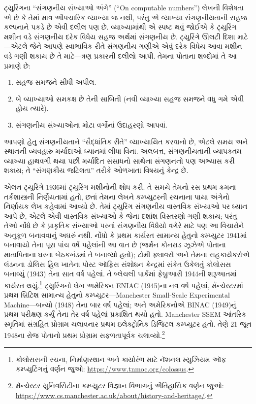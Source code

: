 \documentclass[../../../include/open-logic-section]{subfiles}
\begin{document}
\begin{digress}
ટ્યુરિંગના ``સંગણનીય સંખ્યાઓ અંગે'' (``On computable numbers'') લેખની
વિશેષતા એ છે કે તેમાં
માત્ર ઔપચારિક વ્યાખ્યા જ નથી, પરંતુ એ વ્યાખ્યા સંગણનીયતાની
સહજ કલ્પનાને પકડે છે એવી દલીલ પણ છે. વ્યાખ્યામાંથી એ સ્પષ્ટ
થવું જોઈએ કે ટ્યુરિંગ મશીન વડે સંગણનીય દરેક વિધેય સહજ અર્થમાં
સંગણનીય છે. ટ્યુરિંગે ઊલટી દિશા માટે---એટલે જેને આપણે
સ્વાભાવિક રીતે સંગણનીય ગણીએ એવું દરેક વિધેય આવા મશીન વડે
ગણી શકાય છે તે માટે---ત્રણ પ્રકારની દલીલો આપી. તેમના પોતાના
શબ્દોમાં તે આ પ્રમાણે છે:
\begin{enumerate}
\item સહજ સમજને સીધી અપીલ.
\item બે વ્યાખ્યાઓ સમકક્ષ છે તેની સાબિતી (નવી વ્યાખ્યા સહજ
  સમજને વધુ ગમે એવી હોય ત્યારે).
\item સંગણનીય સંખ્યાઓના મોટા વર્ગોનાં ઉદાહરણો આપવાં.
\end{enumerate}
આપણો હેતુ સંગણનીયતાને ``સૈદ્ધાંતિક રીતે'' વ્યાખ્યાયિત કરવાનો
છે, એટલે સમય અને સ્થાનની વ્યવહારુ મર્યાદાઓ ધ્યાનમાં લીધા
વિના. અલબત્ત, સંગણનીયતાની વ્યાપકતમ વ્યાખ્યા હાથવગી થયા
પછી મર્યાદિત સંસાધનો સાથેના સંગણનનો પણ અભ્યાસ કરી શકાય;
તે ``સંગણકીય જટિલતા'' તરીકે ઓળખાતા વિષયનું કેન્દ્ર છે.
\end{digress}

\begin{history}
એલન ટ્યુરિંગે 1936માં ટ્યુરિંગ મશીનોની શોધ કરી. તે સમયે તેમનો
રસ પ્રથમ ક્રમના તર્કશાસ્ત્રની નિર્ણેયતામાં હતો, છતાં તેમના
લેખને કમ્પ્યુટરની રચનાના પાયા અંગેનો નિર્ણાયક લેખ કહેવામાં
આવ્યો છે. તેમાં ટ્યુરિંગ સંગણનીય વાસ્તવિક સંખ્યાઓ પર ધ્યાન
આપે છે, એટલે એવી વાસ્તવિક સંખ્યાઓ કે જેના દશાંશ વિસ્તરણો
ગણી શકાય; પરંતુ તેઓ નોંધે છે કે પ્રાકૃતિક સંખ્યાઓ પરનાં
સંગણનીય વિધેયો વગેરે માટે પણ આ વિચારોને અનુકૂળ બનાવવાનું
અઘરું નથી. નોંધો કે પ્રથમ કાર્યરત સામાન્ય હેતુનો કમ્પ્યુટર
1941માં બનાવાયો તેના પૂરા પાંચ વર્ષ પહેલાંની આ વાત છે
(જર્મન કોનરાડ ઝૂઝેએ પોતાના માતાપિતાના ઘરના બેઠકખંડમાં તે
બનાવ્યો હતો); ટોમી ફ્લાવર્સ અને તેમના સહકાર્યકરોએ લંડનના
ડોલિસ હિલ ખાતેના પોસ્ટ ઑફિસ સંશોધન કેન્દ્રમાં સંકેત ઉકેલતું
કોલોસસ બનાવ્યું (1943) તેના સાત વર્ષ પહેલાં. તે બ્લેચલી પાર્કમાં
ફેબ્રુઆરી 1944ની શરૂઆતમાં કાર્યરત થયું.\footnote{કોલોસસની રચના,
નિર્માણસ્થાન અને કાર્યારંભ માટે નૅશનલ મ્યુઝિયમ ઑફ કમ્પ્યુટિંગનું
વર્ણન જુઓ: \url{https://www.tnmoc.org/colossus}.}
ટ્યુરિંગનો લેખ અમેરિકન ENIAC (1945)ના નવ વર્ષ પહેલાં,
મૅન્ચેસ્ટરમાં પ્રથમ
બ્રિટિશ સામાન્ય હેતુનો કમ્પ્યુટર---Manchester Small-Scale
Experimental Machine---બન્યો (1948) તેના બાર વર્ષ પહેલાં;
અને અમેરિકનોએ BINAC (1949)નું પ્રથમ પરીક્ષણ કર્યું તેના તેર
વર્ષ પહેલાં પ્રકાશિત થયો હતો. Manchester SSEM આંતરિક સ્મૃતિમાં સંગ્રહિત
પ્રોગ્રામ ચલાવનાર પ્રથમ ઇલેક્ટ્રોનિક ડિજિટલ કમ્પ્યુટર હતો.
તેણે 21 જૂન 1948ના રોજ પોતાનો પ્રથમ પ્રોગ્રામ સફળતાપૂર્વક
ચલાવ્યો.\footnote{મૅન્ચેસ્ટર યુનિવર્સિટીના કમ્પ્યુટર વિજ્ઞાન
વિભાગનું ઐતિહાસિક વર્ણન જુઓ:
\url{https://www.cs.manchester.ac.uk/about/history-and-heritage/}.}
\end{history}
\end{document}
